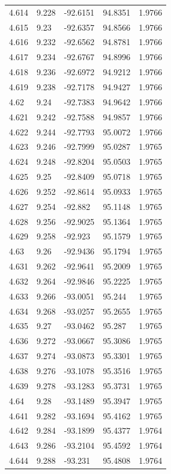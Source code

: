 \begin{tabular}{lllll}
4.614 & 9.228 & -92.6151 & 94.8351 & 1.9766 \\
4.615 & 9.23 & -92.6357 & 94.8566 & 1.9766 \\
4.616 & 9.232 & -92.6562 & 94.8781 & 1.9766 \\
4.617 & 9.234 & -92.6767 & 94.8996 & 1.9766 \\
4.618 & 9.236 & -92.6972 & 94.9212 & 1.9766 \\
4.619 & 9.238 & -92.7178 & 94.9427 & 1.9766 \\
4.62 & 9.24 & -92.7383 & 94.9642 & 1.9766 \\
4.621 & 9.242 & -92.7588 & 94.9857 & 1.9766 \\
4.622 & 9.244 & -92.7793 & 95.0072 & 1.9766 \\
4.623 & 9.246 & -92.7999 & 95.0287 & 1.9765 \\
4.624 & 9.248 & -92.8204 & 95.0503 & 1.9765 \\
4.625 & 9.25 & -92.8409 & 95.0718 & 1.9765 \\
4.626 & 9.252 & -92.8614 & 95.0933 & 1.9765 \\
4.627 & 9.254 & -92.882 & 95.1148 & 1.9765 \\
4.628 & 9.256 & -92.9025 & 95.1364 & 1.9765 \\
4.629 & 9.258 & -92.923 & 95.1579 & 1.9765 \\
4.63 & 9.26 & -92.9436 & 95.1794 & 1.9765 \\
4.631 & 9.262 & -92.9641 & 95.2009 & 1.9765 \\
4.632 & 9.264 & -92.9846 & 95.2225 & 1.9765 \\
4.633 & 9.266 & -93.0051 & 95.244 & 1.9765 \\
4.634 & 9.268 & -93.0257 & 95.2655 & 1.9765 \\
4.635 & 9.27 & -93.0462 & 95.287 & 1.9765 \\
4.636 & 9.272 & -93.0667 & 95.3086 & 1.9765 \\
4.637 & 9.274 & -93.0873 & 95.3301 & 1.9765 \\
4.638 & 9.276 & -93.1078 & 95.3516 & 1.9765 \\
4.639 & 9.278 & -93.1283 & 95.3731 & 1.9765 \\
4.64 & 9.28 & -93.1489 & 95.3947 & 1.9765 \\
4.641 & 9.282 & -93.1694 & 95.4162 & 1.9765 \\
4.642 & 9.284 & -93.1899 & 95.4377 & 1.9764 \\
4.643 & 9.286 & -93.2104 & 95.4592 & 1.9764 \\
4.644 & 9.288 & -93.231 & 95.4808 & 1.9764 \\

\end{tabular}
